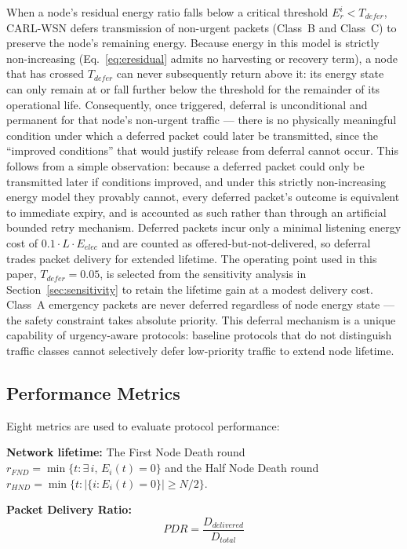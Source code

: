 \documentclass[12pt]{article}
\begin{document}
When a node's residual energy ratio falls below a critical threshold
$E_r^i < T_{defer}$, CARL-WSN defers transmission of non-urgent
packets (Class~B and Class~C) to preserve the node's remaining
energy. Because energy in this model is strictly non-increasing
(Eq.~\ref{eq:eresidual} admits no harvesting or recovery term), a
node that has crossed $T_{defer}$ can never subsequently return above
it: its energy state can only remain at or fall further below the
threshold for the remainder of its operational life. Consequently,
once triggered, deferral is unconditional and permanent for that
node's non-urgent traffic --- there is no physically meaningful
condition under which a deferred packet could later be transmitted,
since the ``improved conditions'' that would justify release from
deferral cannot occur. This follows from a simple observation:
because a deferred packet could only be transmitted later if
conditions improved, and under this strictly non-increasing energy
model they provably cannot, every deferred packet's outcome is
equivalent to immediate expiry, and is accounted as such rather than
through an artificial bounded retry mechanism. Deferred packets
incur only a minimal listening energy cost of $0.1 \cdot L \cdot E_{elec}$ and are counted as
offered-but-not-delivered, so deferral trades packet delivery for
extended lifetime. The operating point used in this paper,
$T_{defer} = 0.05$, is selected from the sensitivity analysis in
Section~\ref{sec:sensitivity} to retain the lifetime gain at a
modest delivery cost. Class~A emergency packets are never deferred
regardless of node energy state --- the safety constraint takes
absolute priority. This deferral mechanism is a unique capability of
urgency-aware protocols: baseline protocols that do not distinguish
traffic classes cannot selectively defer low-priority traffic to
extend node lifetime.

\subsection{Performance Metrics}

Eight metrics are used to evaluate protocol performance:

\textbf{Network lifetime:} The First Node Death round
$r_{FND} = \min\{t : \exists\, i,\, E_i(t) = 0\}$ and the Half
Node Death round $r_{HND} = \min\{t : |\{i : E_i(t) = 0\}|
\geq N/2\}$.

\textbf{Packet Delivery Ratio:}
\begin{equation}
PDR = \frac{D_{delivered}}{D_{total}}
\label{eq:pdr}
\end{equation}
\end{document}
